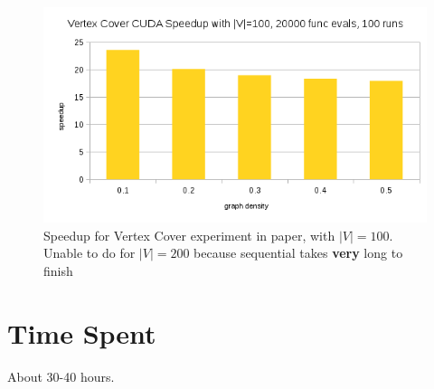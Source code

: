 \documentclass[9pt]{article}
\begin{document}
\begin{figure}[t]
  \centering
  \includegraphics[width=.9\textwidth]{khuri_exper_100.png}
  \caption{Speedup for Vertex Cover experiment in paper, with $|V|=100$. Unable to do for $|V|=200$ because sequential takes \textbf{very} long to finish}
\end{figure}

\section{Time Spent}
About 30-40 hours.


%
\end{document}
